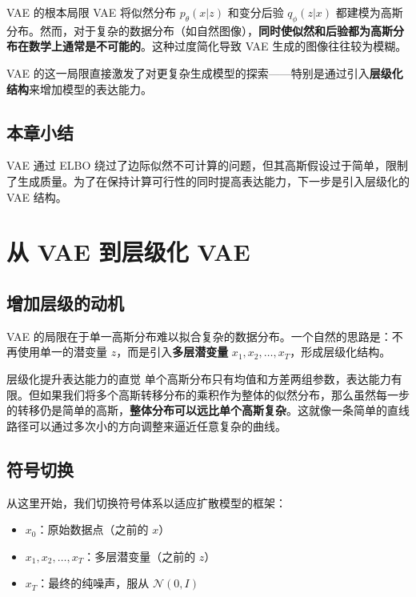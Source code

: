 \documentclass[a4paper]{article}
\begin{document}
\begin{warningbox}{VAE 的根本局限}
VAE 将似然分布 $p_\theta(x|z)$ 和变分后验 $q_\phi(z|x)$ 都建模为高斯分布。然而，对于复杂的数据分布（如自然图像），\textbf{同时使似然和后验都为高斯分布在数学上通常是不可能的}。这种过度简化导致 VAE 生成的图像往往较为模糊。
\end{warningbox}

VAE 的这一局限直接激发了对更复杂生成模型的探索——特别是通过引入\textbf{层级化结构}来增加模型的表达能力。

\subsection{本章小结}

VAE 通过 ELBO 绕过了边际似然不可计算的问题，但其高斯假设过于简单，限制了生成质量。为了在保持计算可行性的同时提高表达能力，下一步是引入层级化的 VAE 结构。


\section{从 VAE 到层级化 VAE}

\subsection{增加层级的动机}

VAE 的局限在于单一高斯分布难以拟合复杂的数据分布。一个自然的思路是：不再使用单一的潜变量 $z$，而是引入\textbf{多层潜变量} $x_1, x_2, \ldots, x_T$，形成层级化结构。

\begin{knowledgebox}{层级化提升表达能力的直觉}
单个高斯分布只有均值和方差两组参数，表达能力有限。但如果我们将多个高斯转移分布的乘积作为整体的似然分布，那么虽然每一步的转移仍是简单的高斯，\textbf{整体分布可以远比单个高斯复杂}。这就像一条简单的直线路径可以通过多次小的方向调整来逼近任意复杂的曲线。
\end{knowledgebox}

\subsection{符号切换}

从这里开始，我们切换符号体系以适应扩散模型的框架：

\begin{itemize}
    \item $x_0$：原始数据点（之前的 $x$）
    \item $x_1, x_2, \ldots, x_T$：多层潜变量（之前的 $z$）
    \item $x_T$：最终的纯噪声，服从 $\mathcal{N}(0, I)$
\end{itemize}
\end{document}
